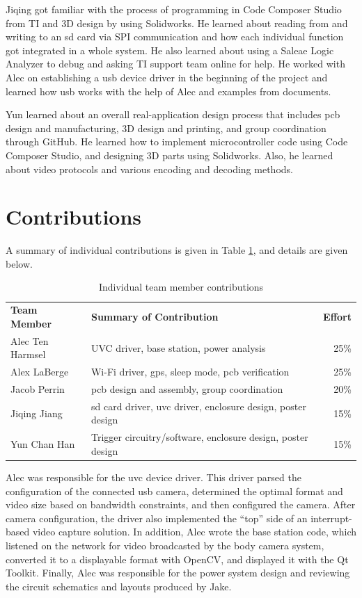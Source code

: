 \documentclass[12pt]{article}
\begin{document}
Jiqing got familiar with the process of programming in Code Composer Studio
from TI and 3D design by using Solidworks. He learned about reading from and
writing to an \gls{sd} card via SPI communication and how each individual
function got integrated in a whole system. He also learned about using a Saleae
Logic Analyzer to debug and asking TI support team online for help. He worked
with Alec on establishing a \gls{usb} device driver in the beginning of the
project and learned how \gls{usb} works with the help of Alec and examples from
documents.

Yun learned about an overall real-application design process that includes
\gls{pcb} design and manufacturing, 3D design and printing, and group
coordination through GitHub. He learned how to implement microcontroller code
using Code Composer Studio, and designing 3D parts using Solidworks. Also, he
learned about video protocols and various encoding and decoding methods.

\section{Contributions}
A summary of individual contributions is given in Table
\ref{tab:individual_contrib}, and details are given below.

\begin{table}[h]
    \centering
    \caption{Individual team member contributions}
    \begin{tabular}{llr}
        \textbf{Team Member} & \textbf{Summary of Contribution} & \textbf{Effort}\\
        Alec Ten Harmsel & UVC driver, base station, power analysis & 25\%\\
        Alex LaBerge & Wi-Fi driver, \gls{gps}, sleep mode, \gls{pcb} verification & 25\%\\
        Jacob Perrin & \gls{pcb} design and assembly, group coordination & 20\%\\
        Jiqing Jiang & \gls{sd} card driver, \gls{uvc} driver, enclosure design, poster design & 15\%\\
        Yun Chan Han & Trigger circuitry/software, enclosure design, poster design & 15\%\\
    \end{tabular}
    \label{tab:individual_contrib}
\end{table}

Alec was responsible for the \gls{uvc} device driver. This driver parsed the
configuration of the connected \gls{usb} camera, determined the optimal format
and video size based on bandwidth constraints, and then configured the camera.
After camera configuration, the driver also implemented the “top” side of an
interrupt-based video capture solution. In addition, Alec wrote the base
station code, which listened on the network for video broadcasted by the body
camera system, converted it to a displayable format with OpenCV, and displayed
it with the Qt Toolkit. Finally, Alec was responsible for the power system
design and reviewing the circuit schematics and layouts produced by Jake.
\end{document}
